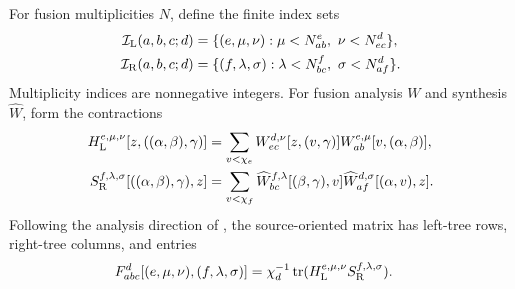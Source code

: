 \begin{definition}
    \leanok
    \label{def:glm_boundary_fusion_f_matrix}
    For fusion multiplicities $N$, define the finite index sets
    \begin{align}
        \mathcal I_{\rm L}(a,b,c;d)
         & =\{(e,\mu,\nu):\mu<N_{ab}^{e},\ \nu<N_{ec}^{d}\},\notag         \\
        \mathcal I_{\rm R}(a,b,c;d)
         & =\{(f,\lambda,\sigma):\lambda<N_{bc}^{f},\ \sigma<N_{af}^{d}\}.
        \notag
    \end{align}
    Multiplicity indices are nonnegative integers. For fusion analysis
    $W$ and synthesis $\widehat W$, form the contractions
    \begin{align}
        H_{\rm L}^{e,\mu,\nu}[z,((\alpha,\beta),\gamma)]
         & =\sum_{v<\chi_e}W_{ec}^{d,\nu}[z,(v,\gamma)]
        W_{ab}^{e,\mu}[v,(\alpha,\beta)],\notag                          \\
        S_{\rm R}^{f,\lambda,\sigma}[((\alpha,\beta),\gamma),z]
         & =\sum_{v<\chi_f}\widehat W_{bc}^{f,\lambda}[(\beta,\gamma),v]
        \widehat W_{af}^{d,\sigma}[(\alpha,v),z].\notag
    \end{align}
    Following the analysis direction of
    \cite[Section~2]{GarreRubio2023MPOSym}, the source-oriented matrix has
    left-tree rows, right-tree columns, and entries
    \begin{align}
        F_{abc}^{d}[(e,\mu,\nu),(f,\lambda,\sigma)]
         & =\chi_d^{-1}\operatorname{tr}
        (H_{\rm L}^{e,\mu,\nu}S_{\rm R}^{f,\lambda,\sigma}).
        \label{eq:glm_boundary_fusion_f_matrix}
    \end{align}
\end{definition}

